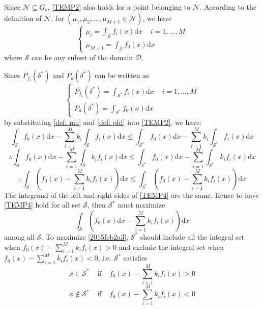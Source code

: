 Since $\mathcal{N} \subseteq G_s$, \eqref{TEMP2} also holds for a point belonging to $\mathcal{N}$.
According to the definition of $\mathcal{N}$, for $(\mu_1, \mu_2, ..., \mu_{M+1} \in \mathcal{N})$, we have  
\begin{equation}
\label{def: mu}
\begin{cases}
\mu_i = \int_{\mathcal{S}}f_i(x)\mathrm{d}x \;\;\;\;i = 1, ..., M\\
\mu_{M+1} = \int_{\mathcal{S}}f_{0}(x)\mathrm{d}x
\end{cases}
\end{equation}
where $\mathcal{S}$ can be any subset of the domain $\mathcal{D}$. 

Since $P_{f_i}(\delta^\ast)$ and $P_{d}(\delta^\ast)$ can be written as
\begin{equation}
\label{def: pfd}
\begin{cases}
P_{f_i}(\delta^\ast) = \int_{\mathcal{S}^\ast}f_i(x)\mathrm{d}x\;\;\;\;i=1, ..., M\\
P_d(\delta^\ast) = \int_{\mathcal{S}^\ast}f_0(x)\mathrm{d}x
\end{cases}
\end{equation}
by substituting \eqref{def: mu} and \eqref{def: pfd} into \eqref{TEMP2}, we have: 
\[
\int_{\mathcal{S}}f_{0}(x)\mathrm{d}x - \sum_{i=1}^{M}k_i\int_{\mathcal{S}}f_i(x)\mathrm{d}x \leq \int_{\mathcal{S}^\ast}f_{0}(x)\mathrm{d}x - \sum_{i=1}^{M}k_i\int_{\mathcal{S}^\ast}f_i(x)\mathrm{d}x
\]
\[
\therefore 
\int_{\mathcal{S}}f_{0}(x)\mathrm{d}x - \sum_{i=1}^{M}\int_{\mathcal{S}}k_if_i(x)\mathrm{d}x \leq \int_{\mathcal{S}^\ast}f_{0}(x)\mathrm{d}x - \sum_{i=1}^{M}\int_{\mathcal{S}^\ast}k_if_i(x)\mathrm{d}x
\]
\begin{equation}
\label{TEMP4}
\therefore \int_{\mathcal{S}}(f_{0}(x)- \sum_{i=1}^{M}k_if_{i}(x))\mathrm{d}x \leq \int_{\mathcal{S}^\ast}(f_{0}(x)- \sum_{i=1}^{M}k_if_{i}(x))\mathrm{d}x 
\end{equation}
The integrand of the left  and right sides of \eqref{TEMP4} are the same. Hence to have  \eqref{TEMP4} hold for all set $\mathcal{S}$,  
then  $\mathcal{S}^\ast$ must  maximize 
\begin{equation}
\int_{\mathcal{S}}(f_{0}(x)\mathrm{d}x - \sum_{i=1}^{M}k_if_i(x))\mathrm{d}x
  \label{2015feb2a3}
\end{equation}
among all $\mathcal{S}$. To maximize \eqref{2015feb2a3}, $\mathcal{S}^\ast$ should include all the integral set when $f_{0}(x)- \sum_{i=1}^{M}k_if_{i}(x) > 0$ and exclude the integral set when $f_{0}(x)- \sum_{i=1}^{M}k_if_{i}(x) < 0$, i.e.   
 $\mathcal{S}^\ast$ satisfies
\[
x \in \mathcal{S}^\ast\;\;\;\;\text{if}\;\;\;\;f_{0}(x)- \sum_{i=1}^{M}k_if_{i}(x) > 0
\]
\[
x \notin \mathcal{S}^\ast\;\;\;\;\text{if}\;\;\;\;f_{0}(x)- \sum_{i=1}^{M}k_if_{i}(x) < 0
\]

